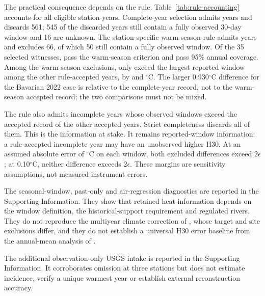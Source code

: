 \documentclass[draft,linenumbers]{agujournal2025}
\begin{document}
The practical consequence depends on the rule. Table~\ref{tab:rule-accounting} accounts for all \CCEligibleYears{} eligible station-years. Complete-year selection admits \CCCompleteAdmitted{} years and discards 561; 545 of the discarded years still contain a fully observed 30-day window and 16 are unknown. The station-specific warm-season rule admits \CCWarmAdmittedYears{} years and excludes 66, of which 50 still contain a fully observed window. Of the 35 selected witnesses, \CCWarmWitnessAdmitted{} pass the warm-season criterion and \CCAnnualWitnessAdmitted{} pass 95\% annual coverage. Among the warm-season exclusions, only \CCWarmExcludedFacts{} exceed the largest reported window among the other rule-accepted years, by \CCWarmIncrementOne{} and \CCWarmIncrementTwo{} $^{\circ}$C. The larger 0.930$^{\circ}$C difference for the Bavarian 2022 case is relative to the complete-year record, not to the warm-season accepted record; the two comparisons must not be mixed.

The rule also admits \CCWarmAdmittedNewFacts{} incomplete years whose observed windows exceed the accepted record of the other accepted years. Strict completeness discards all of them. This is the information at stake. It remains reported-window information: a rule-accepted incomplete year may have an unobserved higher H30. At an assumed absolute error of \CCMarginHalfWidth{}$^{\circ}$C on each window, both excluded differences exceed $2\epsilon$; at 0.10$^{\circ}$C, neither difference exceeds $2\epsilon$. These margins are sensitivity assumptions, not measured instrument errors.



The seasonal-window, past-only and air-regression diagnostics are reported in the Supporting Information. They show that retained heat information depends on the window definition, the historical-support requirement and regulated rivers. They do not reproduce the multiyear climate correction of , whose target and site exclusions differ, and they do not establish a universal H30 error baseline from the annual-mean analysis of .

The additional observation-only USGS intake is reported in the Supporting Information. It corroborates omission at three stations but does not estimate incidence, verify a unique warmest year or establish external reconstruction accuracy.
\end{document}
